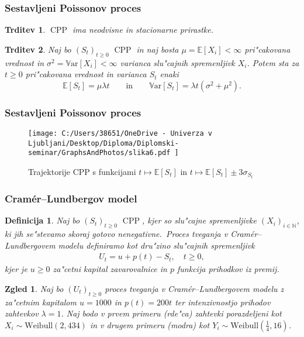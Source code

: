 \documentclass[]{beamer} %
\theoremstyle{plain}
\newtheorem{definicija}{Definicija}
\newtheorem{trditev}{Trditev}
\newtheorem{zgled}{Zgled}
\newcommand{\N}{\mathbb{N}}
\newcommand{\E}{\mathbb{E}}
\newcommand{\Var}[1]{\text{$\mathbb{V}\!\mathrm{ar}$}\left[#1\right]}
\DeclareMathOperator{\CPP}{CPP}
\begin{document}
\begin{frame}
  \frametitle{Sestavljeni Poissonov proces}
  \begin{trditev}
    $\CPP$ ima neodvisne in stacionarne prirastke.
  \end{trditev}
  \pause
  \begin{trditev}
    Naj bo $(S_t)_{t\geq 0}$ $\CPP$ in naj bosta $\mu = \mathbb{E}\left[X_i\right] < \infty$ 
    pri"cakovana vrednost in $\sigma^2= \Var{X_i} <\infty$ varianca
    slu"cajnih spremenljivk $X_i$. Potem sta za $t\geq0$ pri"cakovana vrednost in 
    varianca $S_t$ enaki 
    \begin{equation*}
        \E\left[S_t\right] = \mu\lambda t \qquad \text{in} \qquad \Var{S_t} = \lambda t\left(\sigma^2 + \mu^2\right).
    \end{equation*}
    \label{trd:PricVarCPP}
  \end{trditev}
\end{frame}

\begin{frame}
  \frametitle{Sestavljeni Poissonov proces}
  \begin{figure}[H]
    \centering
    \texttt{[image: 
        C:/Users/38651/OneDrive - Univerza v Ljubljani/Desktop/Diploma/Diplomski-seminar/GraphsAndPhotos/slika6.pdf
        ]}
    \caption{Trajektorije CPP s funkcijami $t \mapsto \E\left[S_t\right]$ in $t \mapsto \E\left[S_t\right] \pm 3\sigma_{S_t}$}
    \label{fig:slika1}
\end{figure}
\end{frame}

\begin{frame}
  \frametitle{Cramér--Lundbergov model}
  \begin{definicija}
    Naj bo $(S_t)_{t\geq0 }$ $\CPP$, kjer so slu"cajne spremenljivke $(X_i)_{i\in\N}$, 
    ki jih se"stevamo skoraj gotovo nenegativne.\ \textit{Proces tveganja} v Cramér--Lundbergovem 
    modelu definiramo kot dru"zino slu"cajnih spremenljivk 
    \begin{align*}
        U_t = u + p(t) - S_t, \quad t\geq0,
    \end{align*}
    kjer je $u \geq 0$ za"cetni kapital zavarovalnice in $p$ funkcija prihodkov iz premij. 
    \label{def:procesTveganja}
  \end{definicija}
  \pause
  \begin{zgled}
    Naj bo $(U_t)_{t\geq0}$ proces tveganja v Cramér--Lundbergovem modelu z za"cetnim kapitalom
    $u = 1000$ in $p(t) = 200t$ ter intenzivnostjo prihodov zahtevkov $\lambda=1$. %
    Naj bodo v prvem primeru (rde"ca) 
    zahtevki porazdeljeni kot $X_i \sim \text{Weibull}(2, 434)$ in v drugem primeru (modra) kot
    $Y_i \sim \text{Weibull}(\tfrac{1}{4}, 16)$.
  \end{zgled}
\end{frame}
\end{document}
